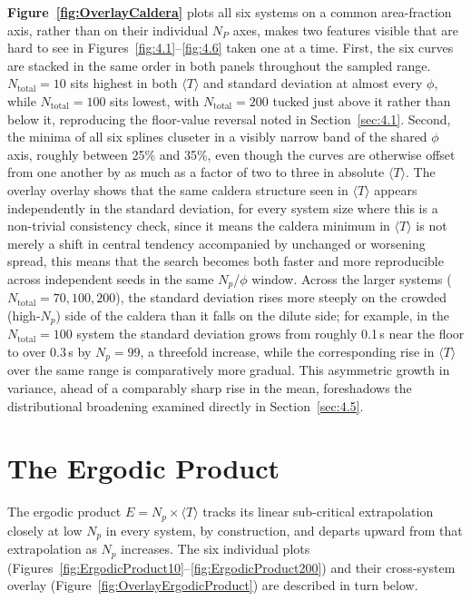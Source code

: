 \textbf{Figure~\ref{fig:OverlayCaldera}} plots all six systems on a common area-fraction axis, rather than on their individual $N_P$ axes, makes two features visible that are hard to see in Figures~\ref{fig:4.1}--\ref{fig:4.6} taken one at a time. First, the six curves are stacked in the same order in both panels throughout the sampled range. $N_\text{total} = 10$ sits highest in both $\langle T \rangle$ and standard deviation at almost every $\phi$, while $N_\text{total} =100$ sits lowest, with $N_\text{total} =200$ tucked just above it rather than below it, reproducing the floor-value reversal noted in Section~\ref{sec:4.1}. Second, the minima of all six splines cluseter in a visibly narrow band of the shared $\phi$ axis, roughly between 25\% and 35\%, even though the curves are otherwise offset from one another by as much as a factor of two to three in absolute $\langle T \rangle$. The overlay overlay shows that the same caldera structure seen in $\langle T \rangle$ appears independently in the standard deviation, for every system size where this is a non-trivial consistency check, since it means the caldera minimum in $\langle T \rangle$ is not merely a shift in central tendency accompanied by unchanged or worsening spread, this means that the search becomes both faster and more reproducible across independent seeds in the same $N_p$/$\phi$ window. Across the larger systems ($N_\text{total} = 70, 100, 200$), the standard deviation rises more steeply on the crowded (high-$N_p$) side of the caldera than it falls on the dilute side; for example, in the $N_\text{total} = 100$ system the standard deviation grows from roughly 0.1\,s near the floor to over 0.3\,s by $N_p =99$, a threefold increase, while the corresponding rise in $\langle T \rangle$ over the same range is comparatively more gradual. This asymmetric growth in variance, ahead of a comparably sharp rise in the mean, foreshadows the distributional broadening examined directly in Section~\ref{sec:4.5}.

\section{The Ergodic Product}
\label{sec:4.4}

The ergodic product $E = N_p \times \langle T \rangle$ tracks its linear sub-critical extrapolation closely at low $N_p$ in every system, by construction, and departs upward from that extrapolation as $N_p$ increases. The six individual plots  (Figures~\ref{fig:ErgodicProduct10}--\ref{fig:ErgodicProduct200}) and their cross-system overlay (Figure~\ref{fig:OverlayErgodicProduct}) are described in turn below.

